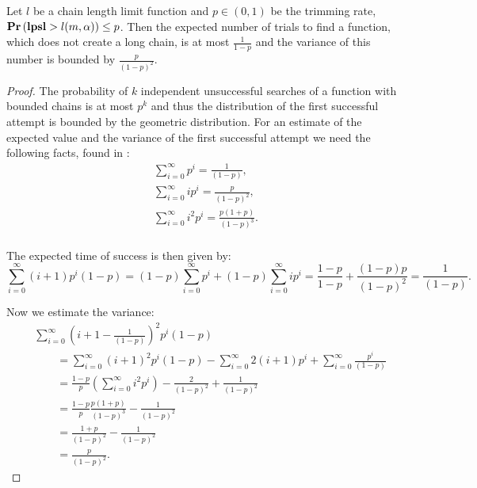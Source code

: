 \begin{lemma}
\label{lemma-linear-transformations-trials}
Let $l$ be a chain length limit function and $p \in (0, 1)$ be the trimming rate, $\mathbf{Pr}\left(\mathbf{lpsl} > l(m, \alpha)\right) \leq p $. Then the expected number of trials to find a function, which does not create a long chain, is at most $\frac{1}{1 - p}$ and the variance of this number is bounded by $\frac p{(1-p) ^ 2}$.
\end{lemma}
\begin{proof}
The probability of $k$ independent unsuccessful searches of a function with bounded chains is at most $p ^ k$ and thus the distribution of the first successful attempt is bounded by the geometric distribution. For an estimate of the expected value and the variance of the first successful attempt we need the following facts, found in \cite{210884}:
\begin{gather*}
	\displaystyle\sum_{i = 0}^{\infty} p ^ i = \frac{1}{(1 - p)} \text{,} \\
	\displaystyle\sum_{i = 0}^{\infty} i p ^ i = \frac{p}{(1 - p) ^ 2} \text{,} \\
	\displaystyle\sum_{i = 0}^{\infty} i^2 p ^ i = \frac{p(1 + p)}{(1 - p) ^ 3} \text{.} \\
\end{gather*}

The expected time of success is then given by:
\[
\sum_{i = 0}^{\infty} (i + 1)p^i(1 - p)= (1 - p)\sum_{i = 0}^{\infty}p^i + (1 - p)\sum_{i = 0}^{\infty}ip^i = \frac{1 - p}{1 - p} + \frac{(1 - p)p}{(1- p)^2} = \frac{1}{(1 - p)} \text{.}
\]

Now we estimate the variance:
\[
\begin{split}
& \sum_{i = 0}^{\infty} \left(i + 1 - \frac{1}{(1 - p)}\right) ^ 2  p ^ i (1 - p) \\
	& \qquad = \sum_{i = 0}^{\infty} \left(i + 1\right) ^ 2 p ^ i (1 - p) - \sum_{i = 0}^{\infty} 2(i + 1)p ^ i + \sum_{i = 0}^{\infty} \frac{p ^ i}{(1 - p)} \\
	& \qquad = \frac{1 - p}{p}\left(\sum_{i = 0}^{\infty} i ^ 2 p ^ i \right) - \frac{2}{(1 - p) ^ 2} + \frac{1}{(1 - p) ^ 2} \\
	& \qquad = \frac{1 - p}{p}\frac{p(1 + p)}{(1 - p) ^ 3} - \frac{1}{(1 - p) ^ 2} \\
	& \qquad = \frac{1 + p }{(1 - p) ^ 2} - \frac{1}{(1 - p) ^ 2} \\
	& \qquad = \frac{p}{(1 - p) ^ 2} \text{.}
\end{split}
\]
\end{proof}

